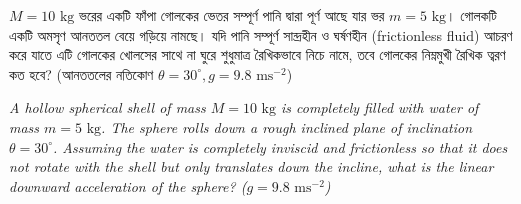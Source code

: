 \documentclass[12pt, a4paper]{article}
\begin{document}
\newpage
\begin{tcolorbox}[questionbox={প্রশ্ন (Question) 41}]
    \noindent
    $M = 10\text{ kg}$ ভরের একটি ফাঁপা গোলকের ভেতর সম্পূর্ণ পানি দ্বারা পূর্ণ আছে যার ভর $m = 5\text{ kg}$। গোলকটি একটি অমসৃণ আনততল বেয়ে গড়িয়ে নামছে। যদি পানি সম্পূর্ণ সান্দ্রহীন ও ঘর্ষণহীন (frictionless fluid) আচরণ করে যাতে এটি গোলকের খোলসের সাথে না ঘুরে শুধুমাত্র রৈখিকভাবে নিচে নামে, তবে গোলকের নিম্নমুখী রৈখিক ত্বরণ কত হবে? (আনততলের নতিকোণ $\theta = 30^\circ, g = 9.8\text{ ms}^{-2}$)
    
    \vspace{0.8em}
    \begin{english}
    \noindent\textit{\color{darkgray}
    A hollow spherical shell of mass $M = 10\text{ kg}$ is completely filled with water of mass $m = 5\text{ kg}$. The sphere rolls down a rough inclined plane of inclination $\theta = 30^\circ$. Assuming the water is completely inviscid and frictionless so that it does not rotate with the shell but only translates down the incline, what is the linear downward acceleration of the sphere? ($g = 9.8\text{ ms}^{-2}$)
    }
    \end{english}
\end{tcolorbox}
\end{document}
